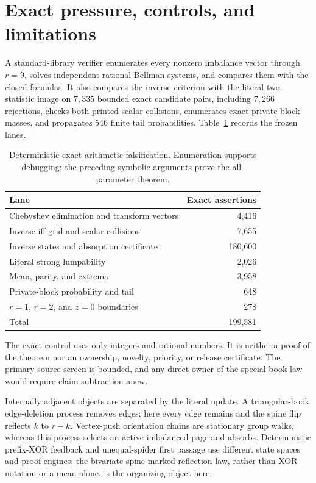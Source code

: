 \documentclass[a4paper,10pt]{amsart}
\theoremstyle{remark}
\begin{document}
\section{Exact pressure, controls, and limitations}\label{sec:audit}

A standard-library verifier enumerates every nonzero imbalance vector through
$r=9$, solves independent rational Bellman systems, and compares them with the
closed formulas.  It also compares the inverse criterion with the literal
two-statistic image on $7{,}335$ bounded exact candidate pairs, including
$7{,}266$ rejections, checks both printed scalar collisions, enumerates exact
private-block masses, and propagates $546$ finite tail probabilities.
Table~\ref{tab:audit} records the frozen lanes.

\begin{table}[ht]
\centering
\small
\caption{Deterministic exact-arithmetic falsification.  Enumeration supports
debugging; the preceding symbolic arguments prove the all-parameter theorem.}
\label{tab:audit}
\begin{tabular}{@{}lr@{}}
\toprule
Lane & Exact assertions \\
\midrule
Chebyshev elimination and transform vectors & 4,416 \\
Inverse iff grid and scalar collisions & 7,655 \\
Inverse states and absorption certificate & 180,600 \\
Literal strong lumpability & 2,026 \\
Mean, parity, and extrema & 3,958 \\
Private-block probability and tail & 648 \\
$r=1$, $r=2$, and $z=0$ boundaries & 278 \\
\midrule
Total & 199,581 \\
\bottomrule
\end{tabular}
\end{table}

The exact control uses only integers and rational numbers.  It is neither a
proof of the theorem nor an ownership, novelty, priority, or release
certificate.  The primary-source screen is bounded, and any direct owner of
the special-book law would require claim subtraction anew.

Internally adjacent objects are separated by the literal update.  A
triangular-book edge-deletion process removes edges; here every edge remains
and the spine flip reflects $k$ to $r-k$.  Vertex-push orientation chains are
stationary group walks, whereas this process selects an active imbalanced
page and absorbs.  Deterministic prefix-XOR feedback and unequal-spider first
passage use different state spaces and proof engines; the bivariate
spine-marked reflection law, rather than XOR notation or a mean alone, is the
organizing object here.
\end{document}
